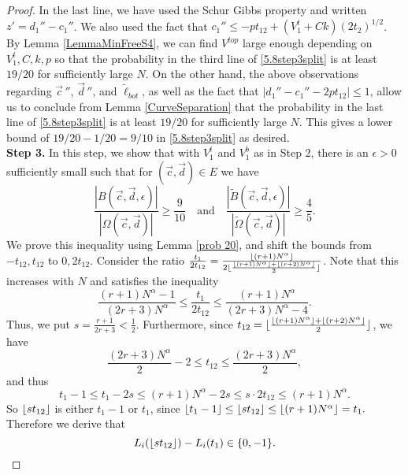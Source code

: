\begin{proof}
	In the last line, we have used the Schur Gibbs property and written $z' = d_1'' - c_1''$. We also used the fact that $c_1'' \leq -pt_{12} + (V_1^t + Ck)(2t_2)^{1/2}$. By Lemma \ref{LemmaMinFreeS4}, we can find $V^{top}$ large enough depending on $V_1^t,C,k,p$ so that the probability in the third line of \eqref{5.8step3split} is at least $19/20$ for sufficiently large $N$. On the other hand, the above observations regarding $\vec{c}\,''$, $\vec{d}\,''$, and $\tilde{\ell}_{bot}$, as well as the fact that $|d_1'' - c_1'' - 2pt_{12}| \leq 1$, allow us to conclude from Lemma \ref{CurveSeparation} that the probability in the last line of \eqref{5.8step3split} is at least $19/20$ for sufficiently large $N$. This gives a lower bound of $19/20 - 1/20 = 9/10$ in \eqref{5.8step3split} as desired.\\
	
	{\bf \raggedleft Step 3.} In this step, we show that with $V_1^t$ and $V_1^b$ as in Step 2, there is an $\epsilon > 0$ sufficiently small such that for $(\vec{c}, \vec{d}) \in E$ we have
	\begin{equation}\label{LemmaBP2Step3}
	\frac{|B(\vec{c}, \vec{d}, \epsilon)|}{|\Omega(\vec{c}, \vec{d})|} \geq  \frac{9}{10} \quad \mathrm{and} \quad \frac{|\tilde{B}(\vec{c}, \vec{d}, \epsilon)|}{|\tilde{\Omega}(\vec{c}, \vec{d})|} \geq  \frac{4}{5}.
	\end{equation}
	We prove this inequality using Lemma \ref{prob 20}, and shift the bounds from $-t_{12},t_{12}$ to $0, 2t_{12}$.
	Consider the ratio $ \frac{t_1}{2t_{12}} = \frac{\lfloor(r+1)N^\alpha\rfloor}{2\lfloor\frac{\lfloor(r+1)N^\alpha\rfloor+\lfloor(r+2)N^\alpha\rfloor}{2}\rfloor}$. Note that this increases with $N$ and satisfies the inequality
	\[
	\frac{(r+1)N^\alpha-1}{(2r+3)N^\alpha}\leq \frac{t_1}{2t_{12}} \leq \frac{(r+1)N^\alpha}{(2r+3)N^\alpha-4}.
	\]
	Thus, we put $s = \frac{r+1}{2r+3} < \frac{1}{2}.$ Furthermore, since $t_{12}=\lfloor\frac{\lfloor(r+1)N^\alpha\rfloor+\lfloor(r+2)N^\alpha\rfloor}{2}\rfloor$, we have 
	\[
	\frac{(2r+3)N^\alpha}{2}-2\leq t_{12}\leq \frac{(2r+3)N^\alpha}{2},
	\]
	and thus
	\[
	t_1-1\leq t_1-2s\leq (r+1)N^\alpha-2s\leq s\cdot 2t_{12}\leq (r+1)N^\alpha.
	\]
	So $\lfloor st_{12}\rfloor$ is either $t_1-1$ or $t_1$, since $\lfloor t_1-1\rfloor\leq \lfloor st_{12}\rfloor\leq \lfloor(r+1)N^\alpha\rfloor=t_1.$
	Therefore we derive that 
	\begin{equation}\label{Lt1Set}L_i(\lfloor st_{12}\rfloor)-L_i(t_1)\in \{0,-1\}.
	\end{equation}
	

\end{proof}
